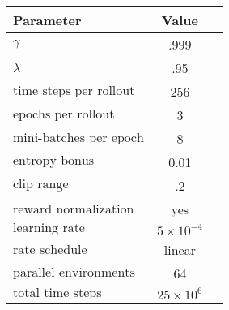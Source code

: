 \begin{tabular}{lcc}
    \toprule
    \textbf{Parameter} & \textbf{Value} \\
    \midrule
    \(\gamma\) & .999 \\
    \(\lambda\) & .95 \\
    \(\text{time steps per rollout}\) & 256 \\
    \(\text{epochs per rollout}\) & 3 \\
    \(\text{mini-batches per epoch}\) & 8 \\
    \(\text{entropy bonus}\) & 0.01 \\
    \(\text{clip range}\) & .2 \\
    \(\text{reward normalization}\) & yes \\
    \(\text{learning rate}\) & \(5 \times 10^{-4}\) \\
    \(\text{rate schedule}\) & linear \\
    \(\text{parallel environments}\) & 64 \\
    \(\text{total time steps}\) & \(25 \times 10^6\) \\
    \bottomrule
\end{tabular}